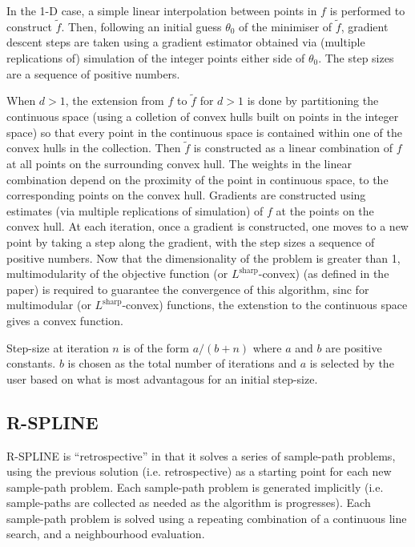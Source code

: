 \message{ !name(SO-Methods.tex)}\documentclass{article}
\begin{document}
In the 1-D case, a simple linear interpolation between points in $f$ is performed to construct $\tilde{f}$. Then, following an initial guess $\theta_0$ of the minimiser of $\tilde{f}$, gradient descent steps are taken using a gradient estimator obtained via (multiple replications of) simulation of the integer points either side of $\theta_0$. The step sizes are a sequence of positive numbers. \newline

When $d>1$, the extension from $f$ to $\tilde{f}$ for $d>1$ is done by partitioning the continuous space (using a colletion of convex hulls built on points in the integer space) so that every point in the continuous space is contained within one of the convex hulls in the collection. Then $\tilde{f}$ is constructed as a linear combination of $f$ at all points on the surrounding convex hull. The weights in the linear combination depend on the proximity of the point in continuous space, to the corresponding points on the convex hull. Gradients are constructed using estimates (via multiple replications of simulation) of $f$ at the points on the convex hull. At each iteration, once a gradient is constructed, one moves to a new point by taking a step along the gradient, with the step sizes a sequence of positive numbers. Now that the dimensionality of the problem is greater than 1, multimodularity of the objective function (or $L^{\text{sharp}}$-convex) (as defined in the paper) is required to guarantee the convergence of this algorithm, sinc for multimodular (or $L^{\text{sharp}}$-convex) functions, the extenstion to the continuous space gives a convex function. \newline

Step-size at iteration $n$ is of the form $a/(b+n)$ where $a$ and $b$ are positive constants. $b$ is chosen as the total number of iterations and $a$ is selected by the user based on what is most advantagous for an initial step-size. 

\subsection{R-SPLINE}

R-SPLINE is ``retrospective'' in that it solves a series of sample-path problems, using the previous solution (i.e. retrospective) as a starting point for each new sample-path problem. Each sample-path problem is generated implicitly (i.e. sample-paths are collected as needed as the algorithm is progresses). Each sample-path problem is solved using a repeating combination of a continuous line search, and a neighbourhood evaluation. \newline
\end{document}
